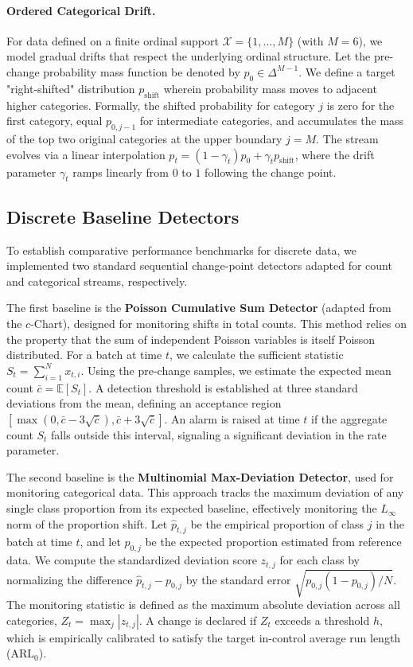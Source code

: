 \documentclass{article}
\theoremstyle{plain}
\theoremstyle{definition}
\theoremstyle{remark}
\begin{document}
\paragraph{Ordered Categorical Drift.}
For data defined on a finite ordinal support $\mathcal{X} = \{1, \dots, M\}$ (with $M=6$), we model gradual drifts that respect the underlying ordinal structure. Let the pre-change probability mass function be denoted by $p_0 \in \Delta^{M-1}$. We define a target "right-shifted" distribution $p_{\text{shift}}$ wherein probability mass moves to adjacent higher categories. Formally, the shifted probability for category $j$ is zero for the first category, equal $p_{0, j-1}$ for intermediate categories, and accumulates the mass of the top two original categories at the upper boundary $j=M$. The stream evolves via a linear interpolation $p_t = (1-\gamma_t)p_0 + \gamma_t p_{\text{shift}}$, where the drift parameter $\gamma_t$ ramps linearly from $0$ to $1$ following the change point.

\subsection{Discrete Baseline Detectors}
\label{app:discrete_baselines}

To establish comparative performance benchmarks for discrete data, we implemented two standard sequential change-point detectors adapted for count and categorical streams, respectively.

The first baseline is the \textbf{Poisson Cumulative Sum Detector} (adapted from the $c$-Chart), designed for monitoring shifts in total counts. This method relies on the property that the sum of independent Poisson variables is itself Poisson distributed. For a batch at time $t$, we calculate the sufficient statistic $S_t = \sum_{i=1}^{N} x_{t,i}$. Using the pre-change samples, we estimate the expected mean count $\bar{c} = \mathbb{E}[S_t]$. A detection threshold is established at three standard deviations from the mean, defining an acceptance region $[\max(0, \bar{c} - 3\sqrt{\bar{c}}), \bar{c} + 3\sqrt{\bar{c}}]$. An alarm is raised at time $t$ if the aggregate count $S_t$ falls outside this interval, signaling a significant deviation in the rate parameter.

The second baseline is the \textbf{Multinomial Max-Deviation Detector}, used for monitoring categorical data. This approach tracks the maximum deviation of any single class proportion from its expected baseline, effectively monitoring the $L_\infty$ norm of the proportion shift. Let $\hat{p}_{t,j}$ be the empirical proportion of class $j$ in the batch at time $t$, and let $p_{0,j}$ be the expected proportion estimated from reference data. We compute the standardized deviation score $z_{t,j}$ for each class by normalizing the difference $\hat{p}_{t,j} - p_{0,j}$ by the standard error $\sqrt{p_{0,j}(1-p_{0,j})/N}$. The monitoring statistic is defined as the maximum absolute deviation across all categories, $Z_t = \max_{j} |z_{t,j}|$. A change is declared if $Z_t$ exceeds a threshold $h$, which is empirically calibrated to satisfy the target in-control average run length ($\mathrm{ARL}_0$).
\end{document}
